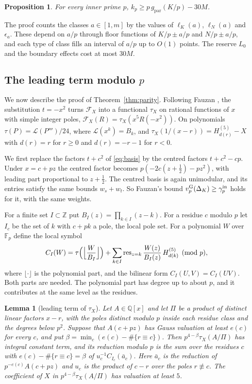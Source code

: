 \documentclass[11pt]{amsart}
\newtheorem{lemma}[theorem]{Lemma}
\newtheorem{proposition}[theorem]{Proposition}
\theoremstyle{definition}
\theoremstyle{remark}
\numberwithin{equation}{section}
\newcommand{\Z}{\mathbb Z}
\newcommand{\Q}{\mathbb Q}
\newcommand{\F}{\mathbb F}
\newcommand{\vG}{v_p^{\mathrm G}}
\newcommand{\gref}{g_{\mathrm{par}}}
\begin{document}
\begin{proposition}\label{prop:kcount}
For every inner prime $p$, $k_p\ge p\,\gref(K/p)-30M$.
\end{proposition}

The proof counts the classes $a\in[1,m]$ by the values of $\ell_K(a)$, $\ell_N(a)$ and $\epsilon_a$. These depend on
$a/p$ through floor functions of $K/p\pm a/p$ and $N/p\pm a/p$, and each type of class fills an interval of $a/p$ up to
$O(1)$ points. The reserve $L_0$ and the boundary effects cost at most $30M$.

\subsection{The leading term modulo $p$}
We now describe the proof of Theorem~\ref{thm:parity}. Following Fauzan \cite[\S3]{Fauzan2026}, the substitution
$t=-x^2$ turns $\mathcal F_X$ into a functional $\tau_X$ on rational functions of $x$ with simple integer poles,
$\mathcal F_X(R)=\tau_X(x^5R(-x^2))$. On polynomials $\tau(P)=\mathcal L(P''')/24$, where $\mathcal L(x^k)=B_k$, and
$\tau_X(1/(x-r))=H^{(5)}_{d(r)}-X$ with $d(r)=r$ for $r\ge0$ and $d(r)=-r-1$ for $r<0$.

We first replace the factors $t+c^2$ of \eqref{eq:basis} by the centred factors $t+c^2-cp$. Under $x=c+pz$ the centred
factor becomes $p(-2c(z+\frac12)-pz^2)$, with leading part proportional to $z+\frac12$. The centred basis is again
unimodular, and its entries satisfy the same bounds $w_s+w_t$. So Fauzan's bound $\vG(\Delta_K)\ge\gamma^{\rm in}_p$
holds for it, with the same weights.

For a finite set $I\subset\Z$ put $B_I(z)=\prod_{k\in I}(z-k)$. For a residue $c$ modulo $p$ let $I_c$ be the set of
$k$ with $c+pk$ a pole, the local pole set. For a polynomial $W$ over $\F_p$ define the local symbol
\begin{equation}\label{eq:localform}
 C_I(W)=\tau\Bigl(\Bigl\lfloor\frac{W}{B_I}\Bigr\rfloor\Bigr)
 +\sum_{k\in I}\operatorname{res}_{z=k}\frac{W(z)}{B_I(z)}\,H^{(5)}_{d(k)}\pmod p,
\end{equation}
where $\lfloor\cdot\rfloor$ is the polynomial part, and the bilinear form $C_I(U,V)=C_I(UV)$. Both parts are needed. The polynomial part has degree up to about
$p$, and it contributes at the same level as the residues.

\begin{lemma}[leading term of $\tau_X$]\label{lem:taulead}
Let $A\in\Q[x]$ and let $\Pi$ be a product of distinct linear factors $x-r$, with the poles distinct modulo $p$ inside
each residue class and the degrees below $p^2$. Suppose that $A(c+pz)$ has Gauss valuation at least $e(c)$ for every
$c$, and put $\beta=\min_c(e(c)-\#\{r\equiv c\})$. Then $p^{4-\beta}\tau_X(A/\Pi)$ has integral constant term, and its
reduction modulo $p$ is the sum over the residues $c$ with $e(c)-\#\{r\equiv c\}=\beta$ of $u_c^{-1}C_{I_c}(\bar a_c)$.
Here $\bar a_c$ is the reduction of $p^{-e(c)}A(c+pz)$ and $u_c$ is the product of $c-r$ over the poles $r\not\equiv c$.
The coefficient of $X$ in $p^{4-\beta}\tau_X(A/\Pi)$ has valuation at least $5$.
\end{lemma}
\end{document}
